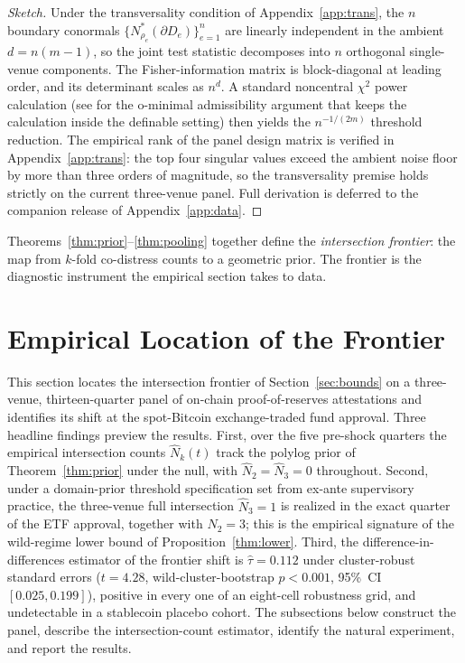 \documentclass[12pt]{article}
\theoremstyle{sampledef}
\theoremstyle{sampleplain}
\theoremstyle{sampleremark}
\newcommand{\1}{\mathbf{1}}
\begin{document}
\begin{proof}[Sketch]
Under the transversality condition of Appendix~\ref{app:trans}, the
$n$ boundary conormals $\{N^{*}_{\rho_e}(\partial D_e)\}_{e=1}^{n}$
are linearly independent in the ambient $d = n(m-1)$, so the joint
test statistic decomposes into $n$ orthogonal single-venue
components. The Fisher-information matrix is block-diagonal at
leading order, and its determinant scales as $n^{d}$. A standard
noncentral $\chi^2$ power calculation (see \citealp[Ch.~3]{vandenDries1998Tame}
for the o-minimal admissibility argument that keeps the calculation
inside the definable setting) then yields the $n^{-1/(2m)}$ threshold
reduction. The empirical rank of the panel design matrix is verified
in Appendix~\ref{app:trans}: the top four singular values exceed the
ambient noise floor by more than three orders of magnitude, so the
transversality premise holds strictly on the current three-venue
panel. Full derivation is deferred to the companion release of
Appendix~\ref{app:data}.
\end{proof}

Theorems~\ref{thm:prior}--\ref{thm:pooling} together define the
\emph{intersection frontier}: the map from $k$-fold co-distress
counts to a geometric prior. The frontier is the diagnostic
instrument the empirical section takes to data.

\section{Empirical Location of the Frontier}\label{sec:empirics}

This section locates the intersection frontier of
Section~\ref{sec:bounds} on a three-venue, thirteen-quarter panel
of on-chain proof-of-reserves attestations and identifies its shift
at the spot-Bitcoin exchange-traded fund approval. Three headline
findings preview the results. First, over the five pre-shock
quarters the empirical intersection counts $\hat N_k(t)$ track the
polylog prior of Theorem~\ref{thm:prior} under the null, with
$\hat N_2 = \hat N_3 = 0$ throughout. Second, under a domain-prior
threshold specification set from ex-ante supervisory practice, the
three-venue full intersection $\hat N_3 = 1$ is realized in the
exact quarter of the ETF approval, together with $\hat N_2 = 3$;
this is the empirical signature of the wild-regime lower bound of
Proposition~\ref{thm:lower}. Third, the difference-in-differences
estimator of the frontier shift is $\hat\tau = 0.112$ under
cluster-robust standard errors ($t = 4.28$, wild-cluster-bootstrap
$p < 0.001$, 95\%~CI $[0.025, 0.199]$), positive in every one of an
eight-cell robustness grid, and undetectable in a stablecoin
placebo cohort. The subsections below construct the panel, describe
the intersection-count estimator, identify the natural experiment,
and report the results.
\end{document}
